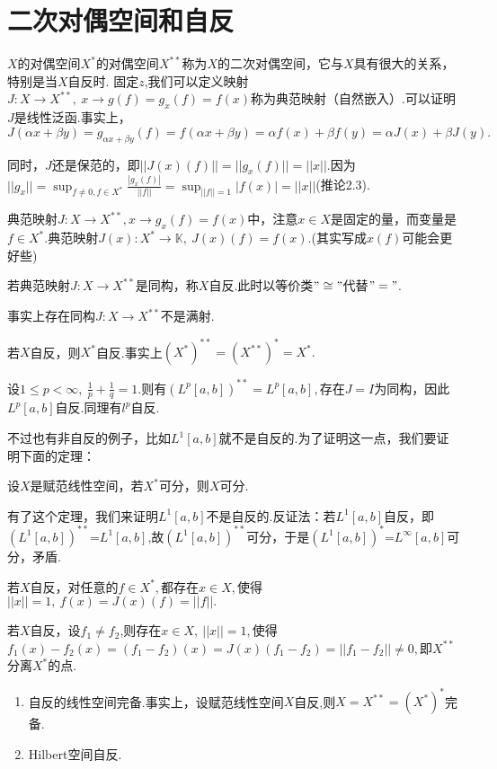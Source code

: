 \documentclass[lang=cn,10pt]{elegantbook}
\begin{document}
	\section{二次对偶空间和自反}
	\(X\)的对偶空间\(X^*\)的对偶空间\(X^{**}\)称为\(X\)的二次对偶空间，它与\(X\)具有很大的关系，特别是当\(X\)自反时.
	固定\(z\),我们可以定义映射\(J:X\to X^{**},\ x\to g(f)=g_x(f)=f(x)\)称为典范映射（自然嵌入）.可以证明\(J\)是线性泛函.事实上，\(J(\alpha x+\beta y)=g_{\alpha x+\beta y}(f)=f(\alpha x+\beta y)=\alpha f(x)+\beta f(y)=\alpha J(x)+\beta J(y).\)
	
	同时，\(J\)还是保范的，即\(||J(x)(f)||=||g_x(f)||=||x||\).因为\(||g_x||=\sup_{f\ne 0,f\in X^*}\frac{|g_x(f)|}{||f||}=\sup_{||f||=1}|f(x)|=||x||\)(推论2.3).
	\begin{note}
		典范映射\(J:X\to X^{**},x\to g_x(f)=f(x)\)中，注意\(x\in X\)是固定的量，而变量是\(f\in X^*.\)典范映射\(J(x):X^*\to \mathbb{K},\ J(x)(f)=f(x)\).(其实写成\(x(f)\)可能会更好些)
	\end{note}
	\begin{definition}[自反]
		若典范映射\(J:X\to X^{**}\)是同构，称\(X\)自反.此时以等价类\("\cong"\)代替\("="\).
	\end{definition}
	\begin{note}
		事实上存在同构\(J:X\to X^{**}\)不是满射.
	\end{note}
	\begin{corollary}
		若\(X\)自反，则\(X^*\)自反.事实上\((X^*)^{**}=(X^{**})^*=X^*.\)
	\end{corollary}
	\begin{example}
		设\(1\le p <\infty,\ \frac{1}{p}+\frac{1}{q}=1.\)则有\((L^p[a,b])^{**}=L^p[a,b],\)存在\(J=I\)为同构，因此\(L^p[a,b]\)自反.同理有\(l^p\)自反.
	\end{example}
	不过也有非自反的例子，比如\(L^1[a,b]\)就不是自反的.为了证明这一点，我们要证明下面的定理：
	\begin{theorem}[2.5.5]
		设\(X\)是赋范线性空间，若\(X^*\)可分，则\(X\)可分.
	\end{theorem}
	有了这个定理，我们来证明\(L^1[a,b]\)不是自反的.反证法：若\(L^1[a,b]\)自反，即\((L^1[a,b])^{**}\)=\(L^1[a,b]\),故\((L^1[a,b])^{**}\)可分，于是\((L^1[a,b])^*\)=\(L^\infty[a,b]\)可分，矛盾.
	\begin{corollary}[对偶]
		若\(X\)自反，对任意的\(f\in X^*,\)都存在\(x\in X,\)使得\(||x||=1,\ f(x)=J(x)(f)=||f||.\)
	\end{corollary}
	\begin{note}
		若\(X\)自反，设\(f_1\ne f_2\),则存在\(x\in X,\ ||x||=1,\)使得\(f_1(x)-f_2(x)=(f_1-f_2)(x)=J(x)(f_1-f_2)=||f_1-f_2||\ne 0,\)即\(X^{**}\)分离\(X^*\)的点.
	\end{note}
	\begin{corollary}
		\begin{enumerate}
			\item 自反的线性空间完备.事实上，设赋范线性空间\(X\)自反,则\(X=X^{**}=(X^*)^*\)完备.
			\item Hilbert空间自反.
		\end{enumerate}
	\end{corollary}
	
\end{document}
